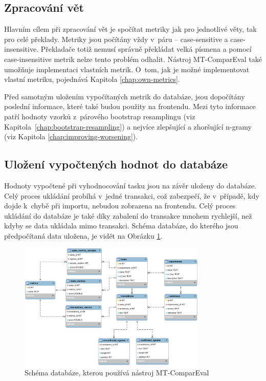 \subsection{Zpracování vět}
Hlavním cílem při zpracování vět je spočítat metriky jak pro jednotlivé věty,
  tak pro celé překlady.
Metriky jsou počítány vždy v~páru -- \mbox{case-sensitive} a \mbox{case-insensitive}.
Překladače totiž nemusí správně překládat velká písmena
  a pomocí \mbox{case-insensitive} metrik nelze tento problém odhalit.
Nástroj \mbox{MT-ComparEval} také umožňuje implementaci vlastních metrik.
O~tom, jak je možné implementovat vlastní metriku, pojednává Kapitola \ref{chap:own-metrics}.

Před samotným uložením vypočítaných metrik do databáze,
  jsou dopočítány poslední informace,
  které také budou použity na frontendu.
Mezi tyto informace patří hodnoty vzorků z~párového bootstrap resamplingu (viz Kapitola~\ref{chap:bootstrap-resampling})
  a nejvíce zlepšující a zhoršující \mbox{n-gramy} (viz Kapitola \ref{chap:improving-worsening}).

\subsection{Uložení vypočtených hodnot do databáze}
Hodnoty vypočtené při vyhodnocování tasku jsou na závěr uloženy do databáze.
Celý proces ukládání probíhá v~jedné transakci,
  což zabezpečí, že v~případě, kdy dojde k~chybě při importu, nebudou zobrazena na frontendu.
Celý proces ukládání do databáze je také díky zabalení do transakce mnohem rychlejší,
  než kdyby se data ukládala mimo transakci.
Schéma databáze, do kterého jsou předpočítaná data uložena, je vidět na Obrázku \ref{img:schema}.
\begin{figure}
	\center
	\includegraphics[width=0.8\textwidth]{img/schema.eps}
	\caption{Schéma databáze, kterou používá nástroj \mbox{MT-ComparEval}}
	\label{img:schema}
\end{figure}


